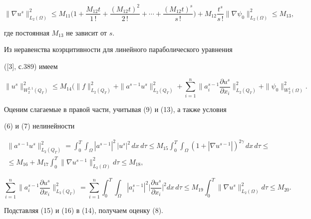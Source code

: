 \begin{pf}
\begin{equation}


\|\nabla u^s\|^2_{L_2(\Omega)}\le M_{11}\biggl(


1+\frac{M_{12}t}{1\,!}+\frac{(M_{12}t)^2}{2\,!}+\dotsb+


\frac{(M_{12}t)^s}{s\,!}\biggr)+M_{12}\frac{t^s}{s\,!}


\|\nabla\psi_0\|^2_{L_2(\Omega)}\le M_{13},


\end{equation}


где постоянная $M_{13}$ не зависит от $s$.





Из неравенства коэрцитивности для линейного параболического уравнения


([3], с.389) имеем


\begin{equation}


\|u^s\|^2_{W^{2,1}_2(Q_T)}\le M_{14}\biggl(


\|f\|^2_{L_2(Q_T)}+\|a^{s-1}u^s\|^2_{L_2(Q_T)}+


\sum^n_{i=1}\biggl\|a^{s-1}_i


\frac{\partial u^s}{\partial x_i}\biggr\|^2_{L_2(Q_T)}


+\|\psi_0\|^2_{W^1_2(\Omega)}.


\end{equation}


Оценим слагаемые в правой части, учитывая (9) и (13), а также условия


(6) и (7) нелинейности


\begin{multline}


\|a^{s-1}u^s\|^2_{L_2(Q_T)}=\int^T_0\int_\Omega


|a^{s-1}|^2\,|u^s|^2\,dx\,d\tau\le M_{15}


\int^T_0\int_\Omega(1+|\nabla u^{s-1}|)^{2\gamma}\,


dx\,d\tau\le \\


\le M_{16}+M_{17}\int^T_0\|\nabla u^{s-1}\|^2_{L_2(\Omega)}


d\tau\le M_{18},


\end{multline}


\begin{equation}


\sum^n_{i=1}\biggl\|a^{s-1}_i\frac{\partial u^s}{\partial x_i}


\biggr\|^2_{L_2(Q_T)}=\sum^n_{i=1}\int^T_0\int_\Omega


|a^{s-1}_i|^2\biggl|\frac{\partial u^s}{\partial x_i}


\biggr|^2 dx\,d\tau \le M_{19}\int^T_0


\|\nabla u^s\|^2_{L_2(\Omega)}d\tau\le M_{20}.


\end{equation}


Подставляя (15) и (16) в (14), получаем оценку (8).


\end{pf}





